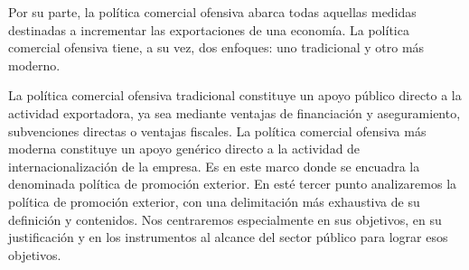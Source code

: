 \documentclass[10pt,a4paper]{article}
\begin{document}
Por su parte, la política comercial ofensiva abarca todas aquellas medidas destinadas a incrementar las exportaciones de una economía. La política comercial ofensiva tiene, a su vez, dos enfoques: uno tradicional y otro más moderno. 


La política comercial ofensiva tradicional constituye un apoyo público directo a la actividad exportadora, ya sea mediante ventajas de financiación y aseguramiento, subvenciones directas o ventajas fiscales. La política comercial ofensiva más moderna constituye un apoyo genérico directo a la actividad de internacionalización de la empresa. Es en este marco donde se encuadra la denominada política de promoción exterior. En esté tercer punto analizaremos la política de promoción exterior, con una delimitación más exhaustiva de su definición y contenidos. Nos centraremos especialmente en sus objetivos, en su justificación y en los instrumentos al alcance del sector público para lograr esos objetivos.



\clearpage
\end{document}
